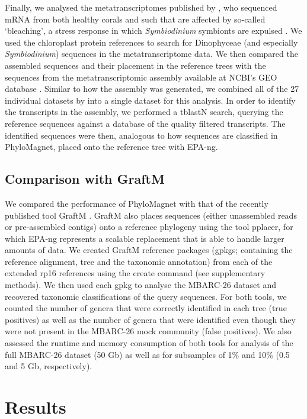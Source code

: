 \documentclass{bioinfo}
\begin{document}
\begin{methods}
Finally, we analysed the metatranscriptomes published by \citet{Frazier2017}, who sequenced mRNA from both healthy corals and such that are affected by so-called ‘bleaching’, a stress response in which \textit{Symbiodinium} symbionts are expulsed \citep{Howe2008}. We used the chloroplast protein references to search for Dinophyceae (and especially \textit{Symbiodinium}) sequences in the metatranscriptome data. We then compared the assembled sequences and their placement in the reference trees with the sequences from the metatranscriptomic assembly available at NCBI’s GEO database \citep{Barrett2012}. Similar to how the assembly was generated, we combined all of the 27 individual datasets by \citet{Frazier2017} into a single dataset for this analysis. In order to identify the transcripts in the assembly, we performed a tblastN search, querying the reference sequences against a database of the quality filtered transcripts. The identified sequences were then, analogous to how sequences are classified in PhyloMagnet, placed onto the reference tree with EPA-ng. 

\subsection{Comparison with GraftM}
We compared the performance of PhyloMagnet with that of the recently published tool GraftM \citep[][v0.11.1]{Boyd2018}. GraftM also places sequences (either unassembled reads or pre-assembled contigs) onto a reference phylogeny using the tool pplacer, for which EPA-ng represents a scalable replacement that is able to handle larger amounts of data.
We created GraftM reference packages (gpkgs; containing the reference alignment, tree and the taxonomic annotation) from each of the extended rp16 references using the create command (see supplementary methods). We then used each gpkg to analyse the MBARC-26 dataset and recovered taxonomic classifications of the query sequences.
For both tools, we counted the number of genera that were correctly identified in each tree (true positives) as well as the number of genera that were identified even though they were not present in the MBARC-26 mock community (false positives). We also assessed the runtime and memory consumption of both tools for analysis of the full MBARC-26 dataset (50 Gb) as well as for subsamples of 1\% and 10\% (0.5 and 5 Gb, respectively).

\end{methods}

\section{Results}\label{results}
\end{document}
